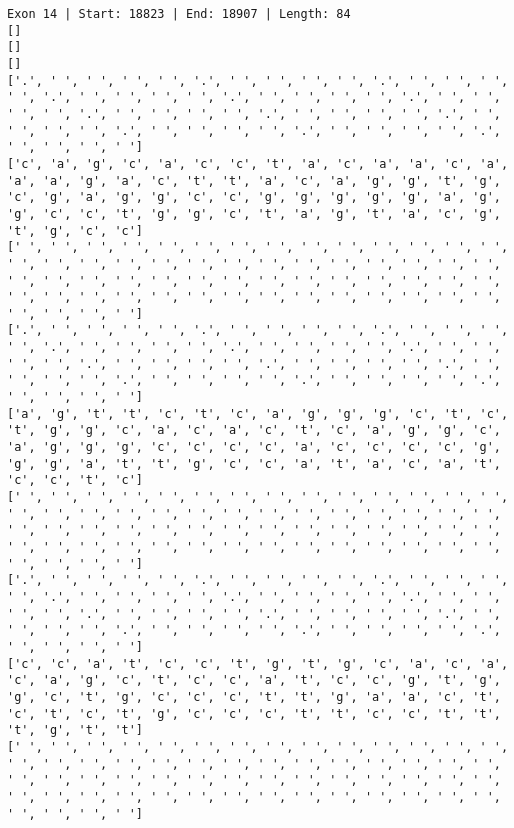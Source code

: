 \documentclass{article}
\begin{document}
\begin{Verbatim}
Exon 14 | Start: 18823 | End: 18907 | Length: 84
[]
[]
[]
['.', ' ', ' ', ' ', ' ', '.', ' ', ' ', ' ', ' ', '.', ' ', ' ', ' ', ' ', '.', ' ', ' ', ' ', ' ', '.', ' ', ' ', ' ', ' ', '.', ' ', ' ', ' ', ' ', '.', ' ', ' ', ' ', ' ', '.', ' ', ' ', ' ', ' ', '.', ' ', ' ', ' ', ' ', '.', ' ', ' ', ' ', ' ', '.', ' ', ' ', ' ', ' ', '.', ' ', ' ', ' ', ' ']
['c', 'a', 'g', 'c', 'a', 'c', 'c', 't', 'a', 'c', 'a', 'a', 'c', 'a', 'a', 'a', 'g', 'a', 'c', 't', 't', 'a', 'c', 'a', 'g', 'g', 't', 'g', 'c', 'g', 'a', 'g', 'g', 'c', 'c', 'g', 'g', 'g', 'g', 'g', 'a', 'g', 'g', 'c', 'c', 't', 'g', 'g', 'c', 't', 'a', 'g', 't', 'a', 'c', 'g', 't', 'g', 'c', 'c']
[' ', ' ', ' ', ' ', ' ', ' ', ' ', ' ', ' ', ' ', ' ', ' ', ' ', ' ', ' ', ' ', ' ', ' ', ' ', ' ', ' ', ' ', ' ', ' ', ' ', ' ', ' ', ' ', ' ', ' ', ' ', ' ', ' ', ' ', ' ', ' ', ' ', ' ', ' ', ' ', ' ', ' ', ' ', ' ', ' ', ' ', ' ', ' ', ' ', ' ', ' ', ' ', ' ', ' ', ' ', ' ', ' ', ' ', ' ', ' ']
['.', ' ', ' ', ' ', ' ', '.', ' ', ' ', ' ', ' ', '.', ' ', ' ', ' ', ' ', '.', ' ', ' ', ' ', ' ', '.', ' ', ' ', ' ', ' ', '.', ' ', ' ', ' ', ' ', '.', ' ', ' ', ' ', ' ', '.', ' ', ' ', ' ', ' ', '.', ' ', ' ', ' ', ' ', '.', ' ', ' ', ' ', ' ', '.', ' ', ' ', ' ', ' ', '.', ' ', ' ', ' ', ' ']
['a', 'g', 't', 't', 'c', 't', 'c', 'a', 'g', 'g', 'g', 'c', 't', 'c', 't', 'g', 'g', 'c', 'a', 'c', 'a', 'c', 't', 'c', 'a', 'g', 'g', 'c', 'a', 'g', 'g', 'g', 'c', 'c', 'c', 'c', 'a', 'c', 'c', 'c', 'c', 'g', 'g', 'g', 'a', 't', 't', 'g', 'c', 'c', 'a', 't', 'a', 'c', 'a', 't', 'c', 'c', 't', 'c']
[' ', ' ', ' ', ' ', ' ', ' ', ' ', ' ', ' ', ' ', ' ', ' ', ' ', ' ', ' ', ' ', ' ', ' ', ' ', ' ', ' ', ' ', ' ', ' ', ' ', ' ', ' ', ' ', ' ', ' ', ' ', ' ', ' ', ' ', ' ', ' ', ' ', ' ', ' ', ' ', ' ', ' ', ' ', ' ', ' ', ' ', ' ', ' ', ' ', ' ', ' ', ' ', ' ', ' ', ' ', ' ', ' ', ' ', ' ', ' ']
['.', ' ', ' ', ' ', ' ', '.', ' ', ' ', ' ', ' ', '.', ' ', ' ', ' ', ' ', '.', ' ', ' ', ' ', ' ', '.', ' ', ' ', ' ', ' ', '.', ' ', ' ', ' ', ' ', '.', ' ', ' ', ' ', ' ', '.', ' ', ' ', ' ', ' ', '.', ' ', ' ', ' ', ' ', '.', ' ', ' ', ' ', ' ', '.', ' ', ' ', ' ', ' ', '.', ' ', ' ', ' ', ' ']
['c', 'c', 'a', 't', 'c', 'c', 't', 'g', 't', 'g', 'c', 'a', 'c', 'a', 'c', 'a', 'g', 'c', 't', 'c', 'c', 'a', 't', 'c', 'c', 'g', 't', 'g', 'g', 'c', 't', 'g', 'c', 'c', 'c', 't', 't', 'g', 'a', 'a', 'c', 't', 'c', 't', 'c', 't', 'g', 'c', 'c', 'c', 't', 't', 'c', 'c', 't', 't', 't', 'g', 't', 't']
[' ', ' ', ' ', ' ', ' ', ' ', ' ', ' ', ' ', ' ', ' ', ' ', ' ', ' ', ' ', ' ', ' ', ' ', ' ', ' ', ' ', ' ', ' ', ' ', ' ', ' ', ' ', ' ', ' ', ' ', ' ', ' ', ' ', ' ', ' ', ' ', ' ', ' ', ' ', ' ', ' ', ' ', ' ', ' ', ' ', ' ', ' ', ' ', ' ', ' ', ' ', ' ', ' ', ' ', ' ', ' ', ' ', ' ', ' ', ' ']

\end{Verbatim}
\end{document}
